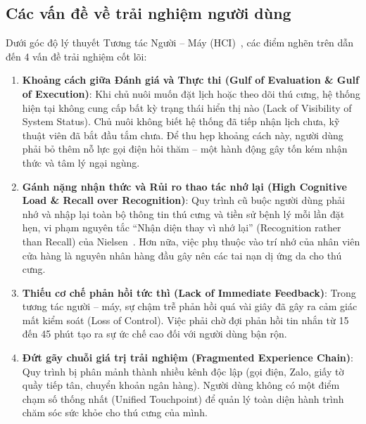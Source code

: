 \subsection{Các vấn đề về trải nghiệm người dùng}
Dưới góc độ lý thuyết Tương tác Người -- Máy (HCI)~\cite{Norman2013}, các điểm nghẽn trên dẫn đến 4 vấn đề trải nghiệm cốt lõi:
\begin{enumerate}
    \item \textbf{Khoảng cách giữa Đánh giá và Thực thi (Gulf of Evaluation \& Gulf of Execution)}: 
    Khi chủ nuôi muốn đặt lịch hoặc theo dõi thú cưng, hệ thống hiện tại không cung cấp bất kỳ trạng thái hiển thị nào (Lack of Visibility of System Status). Chủ nuôi không biết hệ thống đã tiếp nhận lịch chưa, kỹ thuật viên đã bắt đầu tắm chưa. Để thu hẹp khoảng cách này, người dùng phải bỏ thêm nỗ lực gọi điện hỏi thăm -- một hành động gây tốn kém nhận thức và tâm lý ngại ngùng.
    \item \textbf{Gánh nặng nhận thức và Rủi ro thao tác nhớ lại (High Cognitive Load \& Recall over Recognition)}: 
    Quy trình cũ buộc người dùng phải nhớ và nhập lại toàn bộ thông tin thú cưng và tiền sử bệnh lý mỗi lần đặt hẹn, vi phạm nguyên tắc ``Nhận diện thay vì nhớ lại'' (Recognition rather than Recall) của Nielsen~\cite{Nielsen1994}. Hơn nữa, việc phụ thuộc vào trí nhớ của nhân viên cửa hàng là nguyên nhân hàng đầu gây nên các tai nạn dị ứng da cho thú cưng.
    \item \textbf{Thiếu cơ chế phản hồi tức thì (Lack of Immediate Feedback)}: 
    Trong tương tác người -- máy, sự chậm trễ phản hồi quá vài giây đã gây ra cảm giác mất kiểm soát (Loss of Control). Việc phải chờ đợi phản hồi tin nhắn từ 15 đến 45 phút tạo ra sự ức chế cao đối với người dùng bận rộn.
    \item \textbf{Đứt gãy chuỗi giá trị trải nghiệm (Fragmented Experience Chain)}: 
    Quy trình bị phân mảnh thành nhiều kênh độc lập (gọi điện, Zalo, giấy tờ quầy tiếp tân, chuyển khoản ngân hàng). Người dùng không có một điểm chạm số thống nhất (Unified Touchpoint) để quản lý toàn diện hành trình chăm sóc sức khỏe cho thú cưng của mình.
\end{enumerate}
